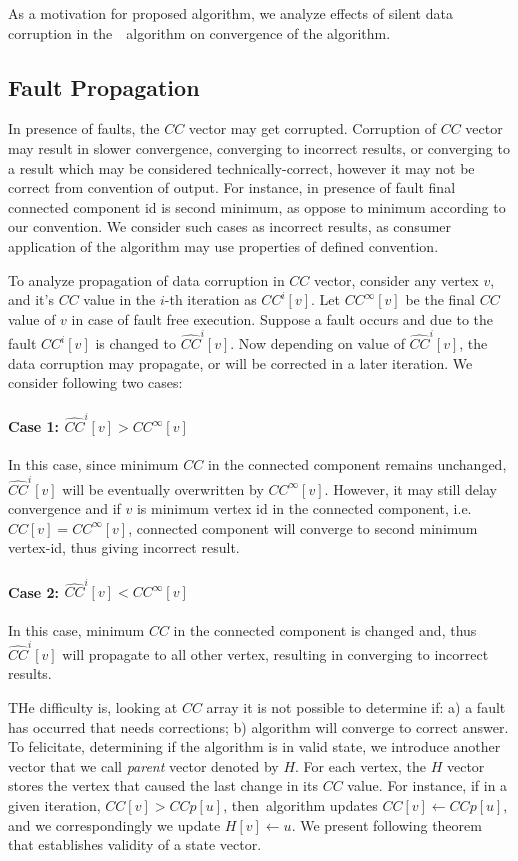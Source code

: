 

As a motivation for proposed algorithm, we analyze effects of silent data corruption in the~\sv~algorithm on convergence of the algorithm.

\subsection{Fault Propagation}
In presence of faults, the $CC$ vector may get corrupted.
Corruption of $CC$ vector may result in slower convergence, converging to incorrect results, or converging to a result which may be considered technically-correct, however it may not be correct from
convention of output. For instance, in presence of fault 
 final connected component id is second minimum, as oppose to minimum according to our convention.
We consider such cases as incorrect results, as consumer application of the algorithm may use properties of defined convention.


To analyze propagation of data corruption in $CC$ vector, consider any vertex $v$, and it's $CC$ value in the $i$-th 
iteration as $CC^{i}[v]$. Let $CC^{\infty}[v]$ be the final $CC$ value of $v$ in case of fault free execution. Suppose a fault occurs and due to the fault $CC^{i}[v]$ is changed to $\hat{CC}^{i}[v]$.
Now depending on value of $\hat{CC}^{i}[v]$, the data corruption may propagate, or will be corrected in a later iteration. We consider following two cases:

\paragraph{Case 1: $\hat{CC}^{i}[v] > CC^{\infty}[v]$} 
In this case, since minimum $CC$ in the connected component remains unchanged,  $\hat{CC}^{i}[v]$ will be eventually overwritten by $CC^{\infty}[v]$. However, it may still delay convergence and if $v$ is minimum vertex id in the connected component, i.e. $CC[v]=CC^{\infty}[v]$, connected component will converge to second minimum vertex-id, thus giving incorrect result.


\paragraph{Case 2: $\hat{CC}^{i}[v] < CC^{\infty}[v]$} 
In this case, minimum $CC$ in the connected component is changed and, thus $\hat{CC}^{i}[v]$ will propagate to all other vertex, resulting in converging to incorrect results.

THe difficulty is, looking at $CC$ array it is not possible to determine if: a) a fault has occurred that needs corrections; b) algorithm will converge to correct answer. To felicitate, determining if the algorithm is in valid state, we introduce another vector that we call \emph{parent} vector denoted by $H$. 
For each vertex, the $H$ vector stores the vertex that caused the last change in its $CC$ value.
For instance, if in a given iteration, $CC[v]>CCp[u]$, then~\sv algorithm updates $CC[v]\leftarrow CCp[u]$, 
and we correspondingly we update $H[v]\leftarrow u$.
We present following theorem that establishes validity of a state vector. 

